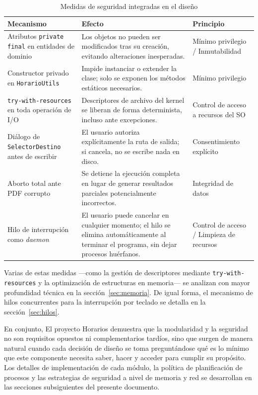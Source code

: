 \begin{table}[H]
\centering
\caption{Medidas de seguridad integradas en el diseño}
\label{tab:seguridad}
\begin{tabular}{|p{4.5cm}|p{4.5cm}|p{4cm}|}
\hline
\textbf{Mecanismo} & \textbf{Efecto} & \textbf{Principio} \\
\hline
Atributos \texttt{private final} en entidades de dominio &
Los objetos no pueden ser modificados tras su creación, evitando alteraciones inesperadas. &
Mínimo privilegio / Inmutabilidad \\
\hline
Constructor privado en \texttt{HorarioUtils} &
Impide instanciar o extender la clase; solo se exponen los métodos estáticos necesarios. &
Mínimo privilegio \\
\hline
\texttt{try-with-resources} en toda operación de I/O &
Descriptores de archivo del kernel se liberan de forma determinista, incluso ante excepciones. &
Control de acceso a recursos del SO \\
\hline
Diálogo de \texttt{SelectorDestino} antes de escribir &
El usuario autoriza explícitamente la ruta de salida; si cancela, no se escribe nada en disco. &
Consentimiento explícito \\
\hline
Aborto total ante PDF corrupto &
Se detiene la ejecución completa en lugar de generar resultados parciales potencialmente incorrectos. &
Integridad de datos \\
\hline
Hilo de interrupción como \textit{daemon} &
El usuario puede cancelar en cualquier momento; el hilo se elimina automáticamente al terminar el programa, sin dejar procesos huérfanos. &
Control de acceso / Limpieza de recursos \\
\hline
\end{tabular}
\end{table}

\noindent Varias de estas medidas —como la gestión de descriptores mediante \texttt{try-with-resources} y la
optimización de estructuras en memoria— se analizan con mayor profundidad técnica en la
sección~\ref{sec:memoria}. De igual forma, el mecanismo de hilos concurrentes para la interrupción
por teclado se detalla en la sección~\ref{sec:hilos}.

\vspace{0.3cm}

En conjunto, El proyecto Horarios demuestra que la modularidad y la seguridad no son requisitos opuestos
ni complementarios tardíos, sino que surgen de manera natural cuando cada decisión de diseño se toma
preguntándose qué es lo mínimo que este componente necesita saber, hacer y acceder para cumplir
su propósito. Los detalles de implementación de cada módulo, la política de planificación de procesos
y las estrategias de seguridad a nivel de memoria y red se desarrollan en las secciones
subsiguientes del presente documento.

